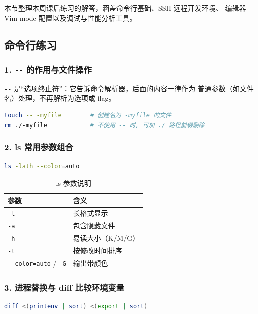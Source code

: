 \documentclass[a4paper,11pt]{ctexart}
\begin{document}
本节整理本周课后练习的解答，涵盖命令行基础、SSH 远程开发环境、
编辑器 Vim mode 配置以及调试与性能分析工具。

\subsection{命令行练习}

\subsubsection{1. \texorpdfstring{\texttt{-{}-}}{--} 的作用与文件操作}

\texttt{-{}-} 是``选项终止符''：它告诉命令解析器，后面的内容一律作为
普通参数（如文件名）处理，不再解析为选项或 flag。

\begin{lstlisting}[language=bash]
touch -- -myfile        # 创建名为 -myfile 的文件
rm ./-myfile            # 不使用 -- 时, 可加 ./ 路径前缀删除
\end{lstlisting}

\subsubsection{2. ls 常用参数组合}

\begin{lstlisting}[language=bash]
ls -lath --color=auto
\end{lstlisting}

\begin{table}[htbp]
  \centering
  \caption{ls 参数说明}\label{tab:lsargs}
  \begin{tabular}{ll}
    \toprule
    参数 & 含义 \\
    \midrule
    \texttt{-l} & 长格式显示 \\
    \texttt{-a} & 包含隐藏文件 \\
    \texttt{-h} & 易读大小（K/M/G） \\
    \texttt{-t} & 按修改时间排序 \\
    \texttt{-{}-color=auto} / \texttt{-G} & 输出带颜色 \\
    \bottomrule
  \end{tabular}
\end{table}

\subsubsection{3. 进程替换与 diff 比较环境变量}

\begin{lstlisting}[language=bash]
diff <(printenv | sort) <(export | sort)
\end{lstlisting}
\end{document}
